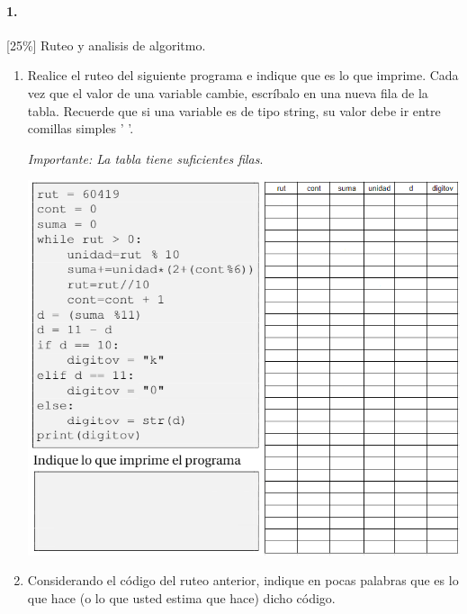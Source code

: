 \paragraph{1.}

[25\%] Ruteo y analisis de algoritmo.

\begin{enumerate}
    \item Realice el ruteo del siguiente programa e indique que es lo que imprime. Cada vez que el valor de una variable cambie, escríbalo en una nueva fila de la tabla. Recuerde que si una variable es de tipo string, su valor debe ir entre comillas simples ’ ’.

    \textit{Importante: La tabla tiene suficientes filas}.
\begin{center}
    \includegraphics[scale=0.80]{Imagenes/pregunta1.png}
\end{center}

    \item Considerando el código del ruteo anterior, indique en pocas palabras que es lo que hace (o lo que usted estima que hace) dicho código.

\end{enumerate}
